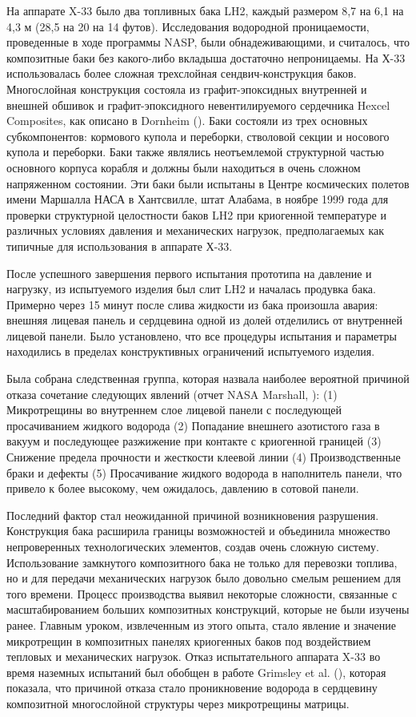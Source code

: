 На аппарате X-33 было два топливных бака LH2, каждый размером 8,7 на 6,1 на 4,3 м (28,5 на 20 на 14 футов). Исследования водородной проницаемости, проведенные в ходе программы NASP, были обнадеживающими, и считалось, что композитные баки без какого-либо вкладыша достаточно непроницаемы. На Х-33 использовалась более сложная трехслойная сендвич-конструкция баков. Многослойная конструкция состояла из графит-эпоксидных внутренней и внешней обшивок и графит-эпоксидного невентилируемого сердечника Hexcel Composites, как описано в Dornheim (\cite{dornheim1999}). Баки состояли из трех основных субкомпонентов: кормового купола и переборки, стволовой секции и носового купола и переборки. Баки также являлись неотъемлемой структурной частью основного корпуса корабля и должны были находиться в очень сложном напряженном состоянии. Эти баки были испытаны в Центре космических полетов имени Маршалла НАСА в Хантсвилле, штат Алабама, в ноябре 1999 года для проверки структурной целостности баков LH2 при криогенной температуре и различных условиях давления и механических нагрузок, предполагаемых как типичные для использования в аппарате Х-33.

После успешного завершения первого испытания прототипа на давление и нагрузку, из испытуемого изделия был слит LH2 и началась продувка бака. Примерно через 15 минут после слива жидкости из бака произошла авария: внешняя лицевая панель и сердцевина одной из долей отделились от внутренней лицевой панели. Было установлено, что все процедуры испытания и параметры находились в пределах конструктивных ограничений испытуемого изделия.

Была собрана следственная группа, которая назвала наиболее вероятной причиной отказа сочетание следующих явлений (отчет NASA Marshall, \cite{nasamarshall2000}):  (1) Микротрещины во внутреннем слое лицевой панели с последующей просачиванием жидкого водорода (2) Попадание внешнего азотистого газа в вакуум и последующее разжижение при контакте с криогенной границей (3) Снижение предела прочности и жесткости клеевой линии (4) Производственные браки и дефекты (5) Просачивание жидкого водорода в наполнитель панели, что привело к более высокому, чем ожидалось, давлению в сотовой панели.

Последний фактор стал неожиданной причиной возникновения разрушения. Конструкция бака расширила границы возможностей  и объединила множество непроверенных технологических элементов, создав очень сложную систему. Использование замкнутого композитного бака не только для перевозки топлива, но и для передачи механических нагрузок было довольно смелым решением для того времени. Процесс производства выявил некоторые сложности, связанные с масштабированием больших композитных конструкций, которые не были изучены ранее. Главным уроком, извлеченным из этого опыта, стало явление и значение микротрещин в композитных панелях криогенных баков под воздействием тепловых и механических нагрузок. Отказ испытательного аппарата X-33 во время наземных испытаний был обобщен в работе Grimsley et al. (\cite{grimsley2001}), которая показала, что причиной отказа стало проникновение водорода в сердцевину композитной многослойной структуры через микротрещины матрицы.


